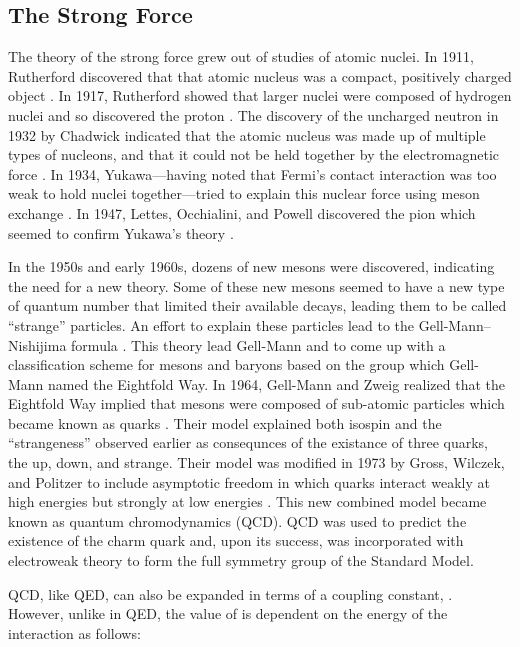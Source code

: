 \subsection{The Strong Force}
\label{ssec:strong_force}

The theory of the strong force grew out of studies of atomic nuclei. In 1911,
Rutherford discovered that that atomic nucleus was a compact, positively
charged object \cite{rutherford1911}. In 1917, Rutherford showed that larger
nuclei were composed of hydrogen nuclei and so discovered the proton
\cite{rutherford1919}. The discovery of the uncharged neutron in 1932 by
Chadwick indicated that the atomic nucleus was made up of multiple types of
nucleons, and that it could not be held together by the electromagnetic force
\cite{chadwick1932}. In 1934, Yukawa---having noted that Fermi's contact
interaction was too weak to hold nuclei together---tried to explain this
nuclear force using meson exchange \cite{yukawa1935}. In 1947, Lettes,
Occhialini, and Powell discovered the pion which seemed to confirm Yukawa's
theory \cite{lattes1947}.

In the 1950s and early 1960s, dozens of new mesons were discovered, indicating
the need for a new theory. Some of these new mesons seemed to have a new type
of quantum number that limited their available decays, leading them to be
called ``strange'' particles. An effort to explain these particles lead to the
Gell-Mann--Nishijima formula \cite{nakano1953,nishijima1955,gellmann1956}. This
theory lead Gell-Mann and \Neeman to come up with a classification scheme for
mesons and baryons based on the \SUthree group which Gell-Mann named the
Eightfold Way. In 1964, Gell-Mann and Zweig realized that the Eightfold Way
implied that mesons were composed of sub-atomic particles which became known as
quarks \cite{gellmann1964,zweig1964}. Their model explained both isospin and
the ``strangeness'' observed earlier as consequnces of the existance of three
quarks, the up, down, and strange. Their model was modified in 1973 by Gross,
Wilczek, and Politzer to include asymptotic freedom in which quarks interact
weakly at high energies but strongly at low energies
\cite{gross_1973,politzer_1973}. This new combined model became known as
quantum chromodynamics (QCD). QCD was used to predict the existence of the
charm quark and, upon its success, was incorporated with electroweak theory to
form the full \SUthreeSUtwoUone symmetry group of the Standard Model.

QCD, like QED, can also be expanded in terms of a coupling constant,
\alphastrong. However, unlike \fsc in QED, the value of \alphastrong is
dependent on the energy of the interaction as follows:


